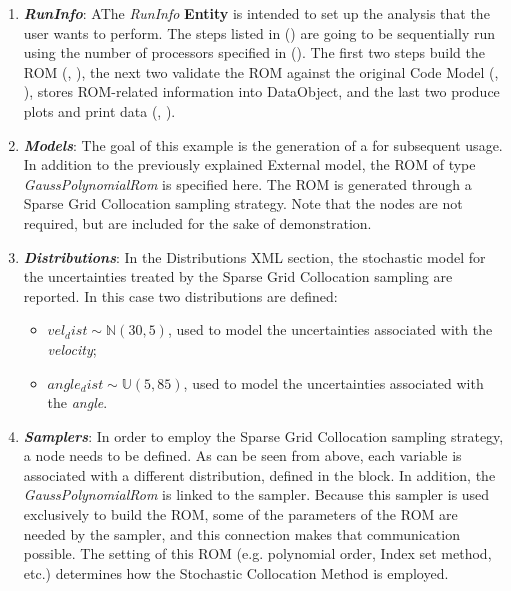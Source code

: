 \begin{enumerate}
   \item \textbf{\textit{RunInfo}}:
   AThe \textit{RunInfo} \textbf{Entity} is intended to set up the analysis  that the user wants to perform. The steps listed in () are going to be sequentially run using the number of processors specified in  ().  The first two steps build the ROM
   (, ), the next two validate
   the ROM against the original Code Model (, ),
    stores ROM-related information into DataObject,
   and the last two produce plots and print data (, ).
   \item \textbf{\textit{Models}}:
 The goal of this example is the generation of a 
 for subsequent usage.  In addition to the previously explained External model, the ROM of type \textit{GaussPolynomialRom} is specified here. The ROM is generated through a Sparse Grid Collocation sampling strategy. Note that the  nodes are not required, but are included for the sake of demonstration.
   \item \textbf{\textit{Distributions}}:
  In the Distributions XML section, the stochastic model for the
  uncertainties  treated by the Sparse Grid Collocation sampling are reported. In
  this case two distributions are defined:
  \begin{itemize}
    \item $vel_dist \sim \mathbb{N}(30,5)$, used to model the uncertainties
    associated with  the \textit{velocity};
    \item  $angle_dist \sim \mathbb{U}(5,85)$,  used to
    model the uncertainties associated with the \textit{angle}.
  \end{itemize}
   \item \textbf{\textit{Samplers}}:
  In order to employ the Sparse Grid Collocation sampling strategy, a
   node needs to be defined.
  As can be  seen from above, each variable is associated with a different distribution,
  defined in the   block.
  In addition, the \textit{GaussPolynomialRom}  is linked to the  sampler.  Because this sampler is used exclusively to build the ROM, some of the parameters of the ROM are  needed by the sampler, and this connection makes that communication possible.  The setting of this ROM (e.g. polynomial order, Index set method, etc.) determines how the Stochastic Collocation Method is employed.


\end{enumerate}
